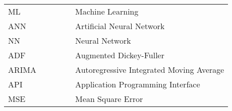 
\abbreviations
 
\begin{tabular}{p{0.3\linewidth}p{2\linewidth}}
    ML & Machine Learning\\
    ANN & Artificial 
    Neural Network \\
    NN & Neural Network \\
    ADF & Augmented Dickey-Fuller \\
	ARIMA & Autoregressive Integrated Moving Average \\
        API & Application Programming Interface\\
        MSE & Mean Square Error \\
	
        	\end{tabular}
        	